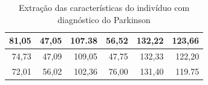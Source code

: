 \begin{table}[h]
\begin{tabular}{|r|r|r|r|r|r|}
81,05                                                                                    & 47,05                                                                                    & 107.38                                                             & 56,52                                                             & 132,22            & 123,66           \\ \hline
74,73                                                                                    & 47,09                                                                                    & 109,05                                                             & 47,75                                                             & 132,33            & 122,20           \\ \hline
72,01                                                                                    & 56,02                                                                                    & 102,36                                                             & 76,00                                                             & 131,40            & 119.75      \\ \hline
\end{tabular}
\caption{Extração das características do indivíduo com diagnóstico do Parkinson}
\label{table:extracao-caracteristica}
\end{table}

